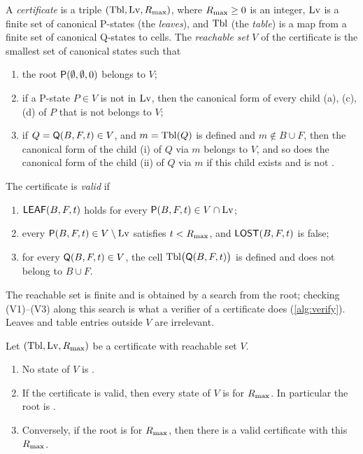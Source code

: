 \begin{definition}[Certificate]\label{def:certificate}
A \emph{certificate} is a triple $(\mathrm{Tbl},\mathrm{Lv},R_{\max})$, where $R_{\max}\ge 0$ is an integer, $\mathrm{Lv}$ is a finite set
of canonical P-states (the \emph{leaves}), and $\mathrm{Tbl}$ (the \emph{table}) is a map from a finite set of
canonical Q-states to cells. The \emph{reachable set} $V$ of the certificate is the smallest set of
canonical states such that
\begin{enumerate}[label=\textup{(R\arabic*)},leftmargin=3em,start=0]
\item the root $\mathsf{P}(\emptyset,\emptyset,0)$ belongs to $V$;
\item if a P-state $P\in V$ is not in $\mathrm{Lv}$, then the canonical form of every child \textup{(a)},
  \textup{(c)}, \textup{(d)} of $P$ that is not \VOID{} belongs to $V$;
\item if $Q=\mathsf{Q}(B,F,t)\in V$, and $m=\mathrm{Tbl}(Q)$ is defined and $m\notin B\cup F$, then the canonical form of the
  child \textup{(i)} of $Q$ via $m$ belongs to $V$, and so does the canonical form of the child \textup{(ii)}
  of $Q$ via $m$ if this child exists and is not \VOID.
\end{enumerate}
The certificate is \emph{valid} if
\begin{enumerate}[label=\textup{(V\arabic*)},leftmargin=3em]
\item $\mathsf{LEAF}(B,F,t)$ holds for every $\mathsf{P}(B,F,t)\in V\cap\mathrm{Lv}$;
\item every $\mathsf{P}(B,F,t)\in V\setminus\mathrm{Lv}$ satisfies $t<R_{\max}$, and $\mathsf{LOST}(B,F,t)$ is false;
\item for every $\mathsf{Q}(B,F,t)\in V$, the cell $\mathrm{Tbl}\bigl(\mathsf{Q}(B,F,t)\bigr)$ is defined and does not belong to
  $B\cup F$.
\end{enumerate}
\end{definition}

The reachable set is finite and is obtained by a search from the root; checking (V1)--(V3) along this search
is what a verifier of a certificate does (\cref{alg:verify}). Leaves and table entries outside $V$
are irrelevant.

\begin{lemma}\label{lem:certificate}
Let $(\mathrm{Tbl},\mathrm{Lv},R_{\max})$ be a certificate with reachable set $V$.
\begin{enumerate}[label=\textup{(\alph*)},leftmargin=2.4em]
\item No state of $V$ is \VOID.
\item If the certificate is valid, then every state of $V$ is \WON{} for $R_{\max}$. In particular the root is
  \WON.
\item Conversely, if the root is \WON{} for $R_{\max}$, then there is a valid certificate with this $R_{\max}$.
\end{enumerate}
\end{lemma}

